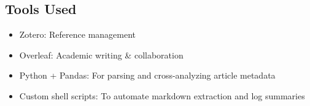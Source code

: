 \subsection{Tools Used}

\begin{itemize}
    \item Zotero: Reference management
    \item Overleaf: Academic writing \& collaboration
    \item Python + Pandas: For parsing and cross-analyzing article metadata
    \item Custom shell scripts: To automate markdown extraction and log summaries
\end{itemize}
